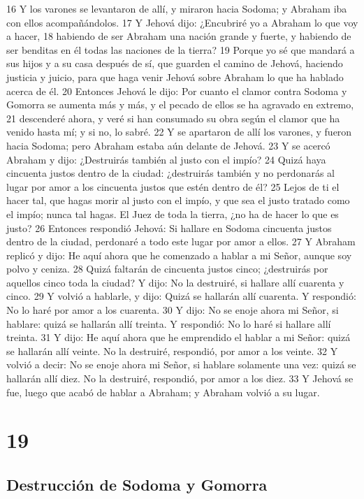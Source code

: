 16 Y los varones se levantaron de allí, y miraron hacia Sodoma; y Abraham iba con ellos acompañándolos.
17 Y Jehová dijo: ¿Encubriré yo a Abraham lo que voy a hacer,
18 habiendo de ser Abraham una nación grande y fuerte, y habiendo de ser benditas en él todas las naciones de la tierra?
19 Porque yo sé que mandará a sus hijos y a su casa después de sí, que guarden el camino de Jehová, haciendo justicia y juicio, para que haga venir Jehová sobre Abraham lo que ha hablado acerca de él.
20 Entonces Jehová le dijo: Por cuanto el clamor contra Sodoma y Gomorra se aumenta más y más, y el pecado de ellos se ha agravado en extremo,
21 descenderé ahora, y veré si han consumado su obra según el clamor que ha venido hasta mí; y si no, lo sabré.
22 Y se apartaron de allí los varones, y fueron hacia Sodoma; pero Abraham estaba aún delante de Jehová.
23 Y se acercó Abraham y dijo: ¿Destruirás también al justo con el impío?
24 Quizá haya cincuenta justos dentro de la ciudad: ¿destruirás también y no perdonarás al lugar por amor a los cincuenta justos que estén dentro de él?
25 Lejos de ti el hacer tal, que hagas morir al justo con el impío, y que sea el justo tratado como el impío; nunca tal hagas. El Juez de toda la tierra, ¿no ha de hacer lo que es justo?
26 Entonces respondió Jehová: Si hallare en Sodoma cincuenta justos dentro de la ciudad, perdonaré a todo este lugar por amor a ellos.
27 Y Abraham replicó y dijo: He aquí ahora que he comenzado a hablar a mi Señor, aunque soy polvo y ceniza.
28 Quizá faltarán de cincuenta justos cinco; ¿destruirás por aquellos cinco toda la ciudad? Y dijo: No la destruiré, si hallare allí cuarenta y cinco.
29 Y volvió a hablarle, y dijo: Quizá se hallarán allí cuarenta. Y respondió: No lo haré por amor a los cuarenta.
30 Y dijo: No se enoje ahora mi Señor, si hablare: quizá se hallarán allí treinta. Y respondió: No lo haré si hallare allí treinta.
31 Y dijo: He aquí ahora que he emprendido el hablar a mi Señor: quizá se hallarán allí veinte. No la destruiré, respondió, por amor a los veinte.
32 Y volvió a decir: No se enoje ahora mi Señor, si hablare solamente una vez: quizá se hallarán allí diez. No la destruiré, respondió, por amor a los diez.
33 Y Jehová se fue, luego que acabó de hablar a Abraham; y Abraham volvió a su lugar.

\chapter{19}

\section*{Destrucción de Sodoma y Gomorra}

